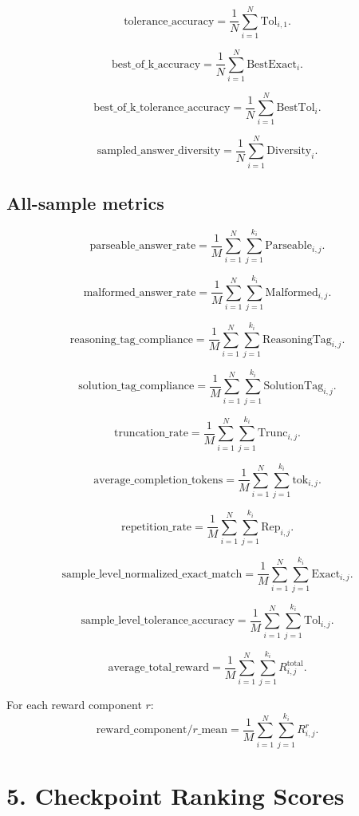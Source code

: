 \documentclass[11pt]{article}
\begin{document}
\[
\mathrm{tolerance\_accuracy}
=
\frac{1}{N}\sum_{i=1}^{N} \mathrm{Tol}_{i,1}.
\]

\[
\mathrm{best\_of\_k\_accuracy}
=
\frac{1}{N}\sum_{i=1}^{N} \mathrm{BestExact}_i.
\]

\[
\mathrm{best\_of\_k\_tolerance\_accuracy}
=
\frac{1}{N}\sum_{i=1}^{N} \mathrm{BestTol}_i.
\]

\[
\mathrm{sampled\_answer\_diversity}
=
\frac{1}{N}\sum_{i=1}^{N} \mathrm{Diversity}_i.
\]

\subsection*{All-sample metrics}
\[
\mathrm{parseable\_answer\_rate}
=
\frac{1}{M}\sum_{i=1}^{N}\sum_{j=1}^{k_i} \mathrm{Parseable}_{i,j}.
\]

\[
\mathrm{malformed\_answer\_rate}
=
\frac{1}{M}\sum_{i=1}^{N}\sum_{j=1}^{k_i} \mathrm{Malformed}_{i,j}.
\]

\[
\mathrm{reasoning\_tag\_compliance}
=
\frac{1}{M}\sum_{i=1}^{N}\sum_{j=1}^{k_i} \mathrm{ReasoningTag}_{i,j}.
\]

\[
\mathrm{solution\_tag\_compliance}
=
\frac{1}{M}\sum_{i=1}^{N}\sum_{j=1}^{k_i} \mathrm{SolutionTag}_{i,j}.
\]

\[
\mathrm{truncation\_rate}
=
\frac{1}{M}\sum_{i=1}^{N}\sum_{j=1}^{k_i} \mathrm{Trunc}_{i,j}.
\]

\[
\mathrm{average\_completion\_tokens}
=
\frac{1}{M}\sum_{i=1}^{N}\sum_{j=1}^{k_i} \mathrm{tok}_{i,j}.
\]

\[
\mathrm{repetition\_rate}
=
\frac{1}{M}\sum_{i=1}^{N}\sum_{j=1}^{k_i} \mathrm{Rep}_{i,j}.
\]

\[
\mathrm{sample\_level\_normalized\_exact\_match}
=
\frac{1}{M}\sum_{i=1}^{N}\sum_{j=1}^{k_i} \mathrm{Exact}_{i,j}.
\]

\[
\mathrm{sample\_level\_tolerance\_accuracy}
=
\frac{1}{M}\sum_{i=1}^{N}\sum_{j=1}^{k_i} \mathrm{Tol}_{i,j}.
\]

\[
\mathrm{average\_total\_reward}
=
\frac{1}{M}\sum_{i=1}^{N}\sum_{j=1}^{k_i} R^{\mathrm{total}}_{i,j}.
\]

For each reward component $r$:
\[
\mathrm{reward\_component}/r\_\mathrm{mean}
=
\frac{1}{M}\sum_{i=1}^{N}\sum_{j=1}^{k_i} R^r_{i,j}.
\]

\section*{5. Checkpoint Ranking Scores}
\end{document}
